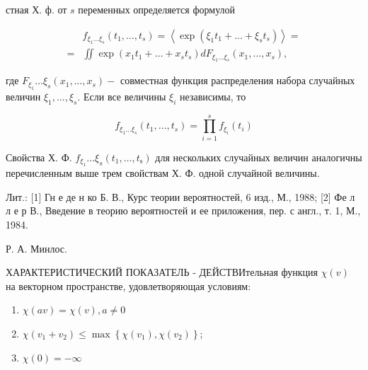 \documentclass[10pt]{article}
\begin{document}
стная Х. ф. от $s$ переменных определяется формулой



\[

\begin{aligned}

& f_{\xi_{1} \ldots \xi_{s}}\left(t_{1}, \ldots, t_{s}\right)=\left\langle\exp \left(\xi_{1} t_{1}+\ldots+\xi_{s} t_{s}\right)\right\rangle= \\

= & \iint \exp \left(x_{1} t_{1}+\ldots+x_{s} t_{s}\right) d F_{\xi_{1} \ldots \xi_{s}}\left(x_{1}, \ldots, x_{s}\right),

\end{aligned}

\]



где $F_{\xi_{1}} \ldots \xi_{s}\left(x_{1}, \ldots, x_{s}\right)-$ совместная функция распределения набора случайных величин $\xi_{1}, \ldots, \xi_{s}$. Если все величины $\xi_{i}$ независимы, то



\[

f_{\xi_{1} \ldots \xi_{s}}\left(t_{1}, \ldots, t_{s}\right)=\prod_{i=1}^{s} f_{\xi_{i}}\left(t_{i}\right)

\]



Свойства Х. Ф. $f_{\xi_{1}} \ldots \xi_{s}\left(t_{1}, \ldots, t_{\mathrm{s}}\right)$ для нескольких случайных величин аналогичны перечисленным выше трем свойствам Х. Ф. одной случайной величины.



Лит.: [1] Гн е де н ко Б. В., Курс теории вероятностей, 6 изд., М., 1988; [2] Фе л л е р В., Введение в теорию вероятностей и ее приложения, пер. с англ., т. 1, М., 1984.



Р. А. Минлос.



ХАРАКТЕРИСТИЧЕСКИЙ ПОКАЗАТЕЛЬ - ДЕЙСТВИтельная функция $\chi(v)$ на векторном пространстве, удовлетворяющая условиям:



\begin{enumerate}

  \item $\chi(a v)=\chi(v), a \neq 0$



  \item $\chi\left(v_{1}+v_{2}\right) \leqslant \max \left\{\chi\left(v_{1}\right), \chi\left(v_{2}\right)\right\}$;



  \item $\chi(0)=-\infty$



\end{enumerate}
\end{document}
